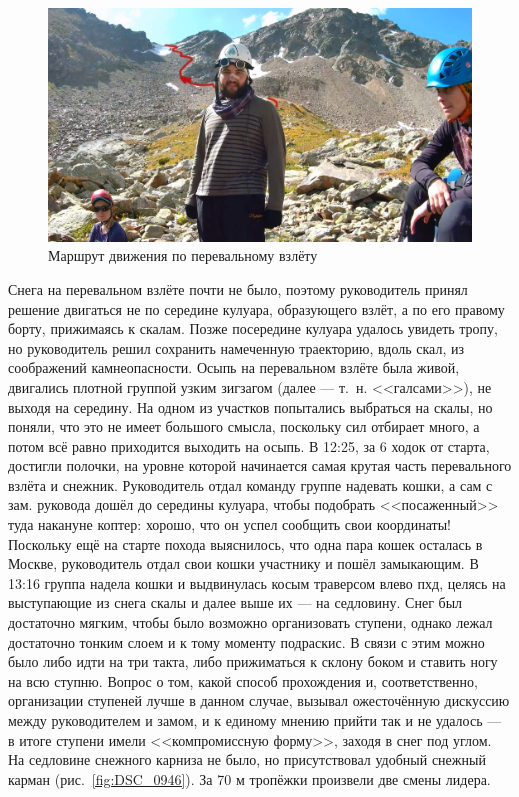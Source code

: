 \begin{figure}[h!]
	\centering
	\includegraphics[width=0.7\linewidth]{../pics/20aug2.jpg}
	\caption{Маршрут движения по перевальному взлёту}
	\label{fig:20aug2.jpg}
\end{figure}

Снега на перевальном взлёте почти не было, поэтому руководитель принял решение двигаться не по середине кулуара, образующего взлёт, а по его правому борту, прижимаясь к скалам. Позже посередине кулуара удалось увидеть тропу, но руководитель решил сохранить намеченную траекторию, вдоль скал, из соображений камнеопасности. Осыпь на перевальном взлёте была живой, двигались плотной группой узким зигзагом (далее --- т.~н. <<галсами>>), не выходя на середину. На одном из участков попытались выбраться на скалы, но поняли, что это не имеет большого смысла, поскольку сил отбирает много, а потом всё равно приходится выходить на осыпь. В 12:25, за 6 ходок от старта, достигли полочки, на уровне которой начинается самая крутая часть перевального взлёта и снежник. Руководитель отдал команду группе надевать кошки, а сам с зам. руковода дошёл до середины кулуара, чтобы подобрать <<посаженный>> туда накануне коптер: хорошо, что он успел сообщить свои координаты! Поскольку ещё на старте похода выяснилось, что одна пара кошек осталась в Москве, руководитель отдал свои кошки участнику и пошёл замыкающим. В 13:16 группа надела кошки и выдвинулась косым траверсом влево пхд, целясь на выступающие из снега скалы и далее выше их --- на седловину. Снег был достаточно мягким, чтобы было возможно организовать ступени, однако лежал достаточно тонким слоем и к тому моменту подраскис. В связи с этим можно было либо идти на три такта, либо прижиматься к склону боком и ставить ногу на всю ступню. Вопрос о том, какой способ прохождения и, соответственно, организации ступеней лучше в данном случае, вызывал ожесточённую дискуссию между руководителем и замом, и к единому мнению прийти так и не удалось --- в итоге ступени имели <<компромиссную форму>>, заходя в снег под углом. На седловине снежного карниза не было, но присутствовал удобный снежный карман (рис.~\ref{fig:DSC_0946}). За 70 м тропёжки произвели две смены лидера.

